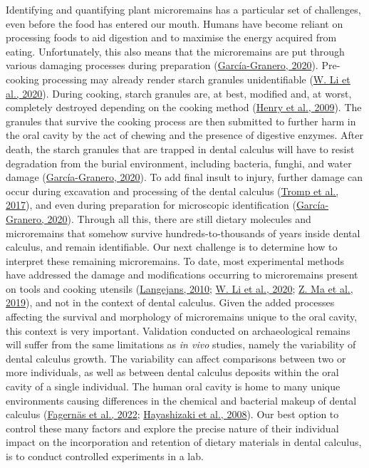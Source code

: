 \documentclass[
  letterpaper,
]{book}
\begin{document}
Identifying and quantifying plant microremains has a particular set of
challenges, even before the food has entered our mouth. Humans have
become reliant on processing foods to aid digestion and to maximise the
energy acquired from eating. Unfortunately, this also means that the
microremains are put through various damaging processes during
preparation
(\protect\hyperlink{ref-graneroStarchTaphonomy2020}{García-Granero,
2020}). Pre-cooking processing may already render starch granules
unidentifiable (\protect\hyperlink{ref-liInfluenceGrinding2020}{W. Li et
al., 2020}). During cooking, starch granules are, at best, modified and,
at worst, completely destroyed depending on the cooking method
(\protect\hyperlink{ref-henryCookingStarch2009}{Henry et al., 2009}).
The granules that survive the cooking process are then submitted to
further harm in the oral cavity by the act of chewing and the presence
of digestive enzymes. After death, the starch granules that are trapped
in dental calculus will have to resist degradation from the burial
environment, including bacteria, funghi, and water damage
(\protect\hyperlink{ref-graneroStarchTaphonomy2020}{García-Granero,
2020}). To add final insult to injury, further damage can occur during
excavation and processing of the dental calculus
(\protect\hyperlink{ref-trompEDTACalculus2017}{Tromp et al., 2017}), and
even during preparation for microscopic identification
(\protect\hyperlink{ref-graneroStarchTaphonomy2020}{García-Granero,
2020}). Through all this, there are still dietary molecules and
microremains that somehow survive hundreds-to-thousands of years inside
dental calculus, and remain identifiable. Our next challenge is to
determine how to interpret these remaining microremains. To date, most
experimental methods have addressed the damage and modifications
occurring to microremains present on tools and cooking utensils
(\protect\hyperlink{ref-langejansRemainsDay2010}{Langejans, 2010};
\protect\hyperlink{ref-liInfluenceGrinding2020}{W. Li et al., 2020};
\protect\hyperlink{ref-maMorphologicalChanges2019}{Z. Ma et al., 2019}),
and not in the context of dental calculus. Given the added processes
affecting the survival and morphology of microremains unique to the oral
cavity, this context is very important. Validation conducted on
archaeological remains will suffer from the same limitations as \emph{in
vivo} studies, namely the variability of dental calculus growth. The
variability can affect comparisons between two or more individuals, as
well as between dental calculus deposits within the oral cavity of a
single individual. The human oral cavity is home to many unique
environments causing differences in the chemical and bacterial makeup of
dental calculus
(\protect\hyperlink{ref-fagernasMicrobialBiogeography2022}{Fagernäs et
al., 2022};
\protect\hyperlink{ref-hayashizakiSiteSpecific2008}{Hayashizaki et al.,
2008}). Our best option to control these many factors and explore the
precise nature of their individual impact on the incorporation and
retention of dietary materials in dental calculus, is to conduct
controlled experiments in a lab.
\end{document}
